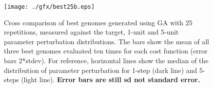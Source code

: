





\begin{figure}[tb!]
  \centering
  \texttt{[image: ./gfx/best25b.eps]}
  \caption{Cross comparison of best genomes generated using GA with 25
    repetitions, measured against the target, 1-unit and 5-unit parameter
    perturbation distributions.  The bars show the mean of all three best
    genomes evaluated ten times for each cost function (error bars 2*stdev). For
    reference, horizontal lines show the median of the distribution of
    parameter perturbation for 1-step (dark line) and 5-steps (light
    line). {\textbf{Error bars are still sd not standard error.}}}\label{fig:R2}
\end{figure}


\newpage





